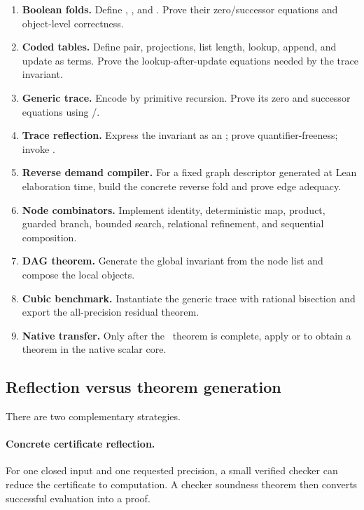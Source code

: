 \begin{enumerate}[label=\textbf{M\arabic*.},leftmargin=3em]
\item \textbf{Boolean folds.}
      Define , , and .
      Prove their zero/successor equations and object-level correctness.
\item \textbf{Coded tables.}
      Define pair, projections, list length, lookup, append, and update as
       terms.  Prove the lookup-after-update equations needed by the
      trace invariant.
\item \textbf{Generic trace.}
      Encode  by primitive recursion.  Prove its zero and successor
      equations using /.
\item \textbf{Trace reflection.}
      Express the invariant as an ; prove quantifier-freeness;
      invoke .
\item \textbf{Reverse demand compiler.}
      For a fixed graph descriptor generated at Lean elaboration time, build
      the concrete  reverse fold and prove edge adequacy.
\item \textbf{Node combinators.}
      Implement identity, deterministic map, product, guarded branch,
      bounded search, relational refinement, and sequential composition.
\item \textbf{DAG theorem.}
      Generate the global invariant from the node list and compose the local
       objects.
\item \textbf{Cubic benchmark.}
      Instantiate the generic trace with rational bisection and export the
      all-precision residual theorem.
\item \textbf{Native transfer.}
      Only after the \PRAAx\ theorem is complete, apply
       or  to obtain a theorem in the
      native scalar core.
\end{enumerate}

\subsection{Reflection versus theorem generation}

There are two complementary strategies.

\paragraph{Concrete certificate reflection.}
For one closed input and one requested precision, a small verified checker
can reduce the certificate to computation.  A checker soundness theorem then
converts successful evaluation into a proof.

